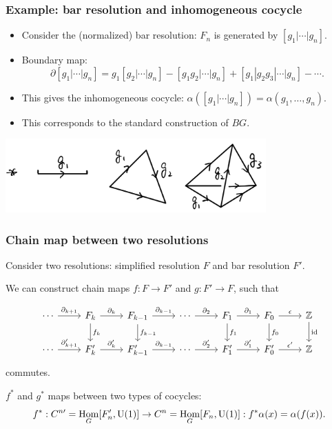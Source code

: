 \documentclass[xcolor=table, aspectratio=169,ignorenonframetext]{beamer}
\DeclareMathOperator{\hhom}{Hom}
\newcommand{\uone}{\text U(1)}
\DeclareMathOperator{\id}{id}
\begin{document}
\begin{frame}
	\frametitle{Example: bar resolution and inhomogeneous cocycle}
	\begin{itemize}
		\item Consider the (normalized) bar resolution:
		$F_n$ is generated by $[g_1|\cdots|g_n]$.
		\item Boundary map:
		\[\partial[g_1|\cdots|g_n]=g_1[g_2|\cdots|g_n]
		-[g_1g_2|\cdots|g_n]+[g_1|g_2g_3|\cdots|g_n]-\cdots.\]
		\item This gives the inhomogeneous cocycle:
		$\alpha([g_1|\cdots|g_n])=\alpha(g_1,\ldots,g_n)$.
		\item This corresponds to the standard construction of $BG$.
	\end{itemize}
\begin{center}
	\includegraphics[width=10cm]{../chainmap/bg-std}
\end{center}
\end{frame}

\begin{frame}[fragile]
	\frametitle{Chain map between two resolutions}
	\begin{itemize}
		\item Consider two resolutions: simplified resolution $F$ and bar resolution $F'$.
		\item We can construct chain maps $f:F\rightarrow F'$ and $g:F'\rightarrow F$, such that
		{\small\[\begin{tikzcd}
		\cdots\arrow[r,"\partial_{k+1}"]&
		F_k\arrow[r,"\partial_k"]\arrow[d,"f_k"]&
		F_{k-1}\arrow[r,"\partial_{k-1}"]\arrow[d,"f_{k-1}"]&
		\cdots\arrow[r,"\partial_2"]&
		F_1\arrow[r,"\partial_1"]\arrow[d,"f_1"]&
		F_0\arrow[r,"\epsilon"]\arrow[d,"f_0"]&
		\mathbb Z\arrow[d,"\id"]\\
		\cdots\arrow[r,"\partial_{k+1}'"]&
		F_k'\arrow[r,"\partial_k'"]&
		F_{k-1}'\arrow[r,"\partial_{k-1}"]&
		\cdots\arrow[r,"\partial_2'"]&
		F_1'\arrow[r,"\partial_1'"]&
		F_0'\arrow[r,"\epsilon'"]&
		\mathbb Z
		\end{tikzcd}\]
		commutes.
		\item $f^\ast$ and $g^\ast$ maps between two types of cocycles:
		\[f^\ast:C^{n\prime} = \hhom_G[F^\prime_n,\uone]\rightarrow C^n=\hhom_G[F_n,\uone]:
		f^\ast\alpha(x)=\alpha(f(x)).\]}
	\end{itemize}
\end{frame}
\end{document}
